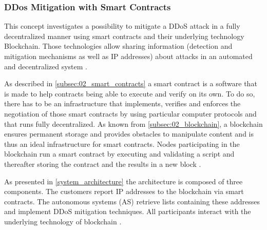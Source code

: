 \subsubsection{DDos Mitigation with Smart Contracts}
This concept investigates a possibility to mitigate a DDoS attack in a fully decentralized manner using smart contracts and their underlying technology Blockchain. Those technologies allow sharing information (detection and mitigation mechanisms as well as IP addresses) about attacks in an automated and decentralized system \cite{Rodrigues2017}.

As described in \ref{subsec:02_smart_contracts} a smart contract is a software that is made to help contracts being able to execute and verify on its own. To do so, there has to be an infrastructure that implements, verifies and enforces the negotiation of those smart contracts by using particular computer protocols and that runs fully decentralized. As known from \ref{subsec:02_blockchain}, a blockchain ensures permanent storage and provides obstacles to manipulate content and is thus an ideal infrastructure for smart contracts. Nodes participating in the blockchain run a smart contract by executing and validating a script and thereafter storing the contract and the results in a new block \cite{Rodrigues2017}.

As presented in \ref{system_architecture} the architecture is composed of three components. The customers report IP addresses to the blockchain via smart contracts. The autonomous systems (AS) retrieve lists containing these addresses and implement DDoS mitigation techniques. All participants interact with the underlying technology of blockchain \cite{Rodrigues2017}.

